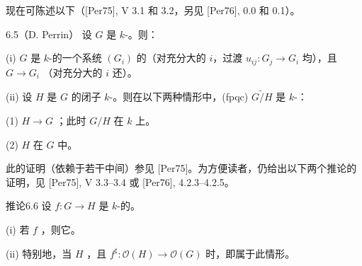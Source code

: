 现在可陈述以下（[Per75], V 3.1 和 3.2，另见 [Per76], 0.0 和 0.1）。
\begin{SGAresult}{}{6.5（D. Perrin）}
设 $G$ 是 $k$-。则：

(i) $G$ 是 $k$-的一个系统 $(G_i)$ 的（对充分大的 $i$，过渡 $u_{ij}:G_j\to G_i$ 均），且 $G\to G_i$ （对充分大的 $i$ 还）。

(ii) 设 $H$ 是 $G$ 的闭子 $k$-。则在以下两种情形中，(fpqc)  $\widetilde{G/H}$ 是 $k$-：

(1)  $H\to G$ ；此时 $G/H$ 在 $k$ 上。

(2) $H$ 在 $G$ 中。
\end{SGAresult}
此的证明（依赖于若干中间）参见 [Per75]。为方便读者，仍给出以下两个推论的证明，见 [Per75], V 3.3--3.4 或 [Per76], 4.2.3--4.2.5。
\begin{SGAresult}{推论}{6.6}
设 $f:G\to H$ 是 $k$-的。

(i) 若 $f$ ，则它。

(ii) 特别地，当 $H$ ，且 $f^\sharp:\mathcal O(H)\to\mathcal O(G)$ 时，即属于此情形。
\end{SGAresult}
